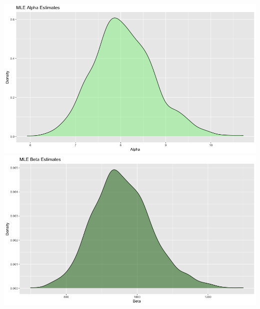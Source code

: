 \documentclass{article}\usepackage[]{graphicx}\usepackage[]{xcolor}
\begin{document}
\includegraphics[scale=0.25]{MLE ALPHA DENSITY.png}
\includegraphics[scale=0.25]{MLE BETA DENSITY.png}
\end{document}
